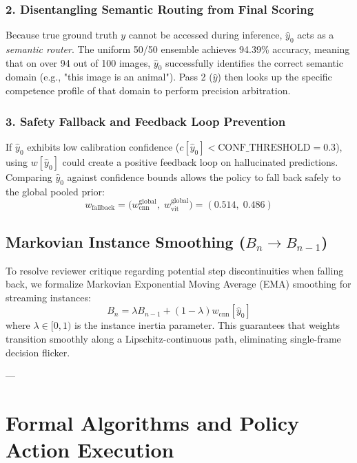 \documentclass[10pt,journal,compsoc]{IEEEtran}
\begin{document}
\subsubsection{2. Disentangling Semantic Routing from Final Scoring}
Because true ground truth $y$ cannot be accessed during inference, $\hat{y}_0$ acts as a \textit{semantic router}. The uniform 50/50 ensemble achieves 94.39\% accuracy, meaning that on over 94 out of 100 images, $\hat{y}_0$ successfully identifies the correct semantic domain (e.g., "this image is an animal"). Pass 2 ($\hat{y}$) then looks up the specific competence profile of that domain to perform precision arbitration.

\subsubsection{3. Safety Fallback and Feedback Loop Prevention}
If $\hat{y}_0$ exhibits low calibration confidence ($c[\hat{y}_0] < \text{CONF\_THRESHOLD} = 0.3$), using $w[\hat{y}_0]$ could create a positive feedback loop on hallucinated predictions. Comparing $\hat{y}_0$ against confidence bounds allows the policy to fall back safely to the global pooled prior:
\begin{equation}
w_{\text{fallback}} = \big(w_{\text{cnn}}^{\text{global}}, \; w_{\text{vit}}^{\text{global}}\big) = (0.514, \; 0.486)
\end{equation}

\subsection{Markovian Instance Smoothing ($B_n \to B_{n-1}$)}
To resolve reviewer critique regarding potential step discontinuities when falling back, we formalize Markovian Exponential Moving Average (EMA) smoothing for streaming instances:
\begin{equation}
B_n = \lambda B_{n-1} + (1 - \lambda) w_{\text{cnn}}[\hat{y}_0]
\end{equation}
where $\lambda \in [0, 1)$ is the instance inertia parameter. This guarantees that weights transition smoothly along a Lipschitz-continuous path, eliminating single-frame decision flicker.

---

\section{Formal Algorithms and Policy Action Execution}
\end{document}
